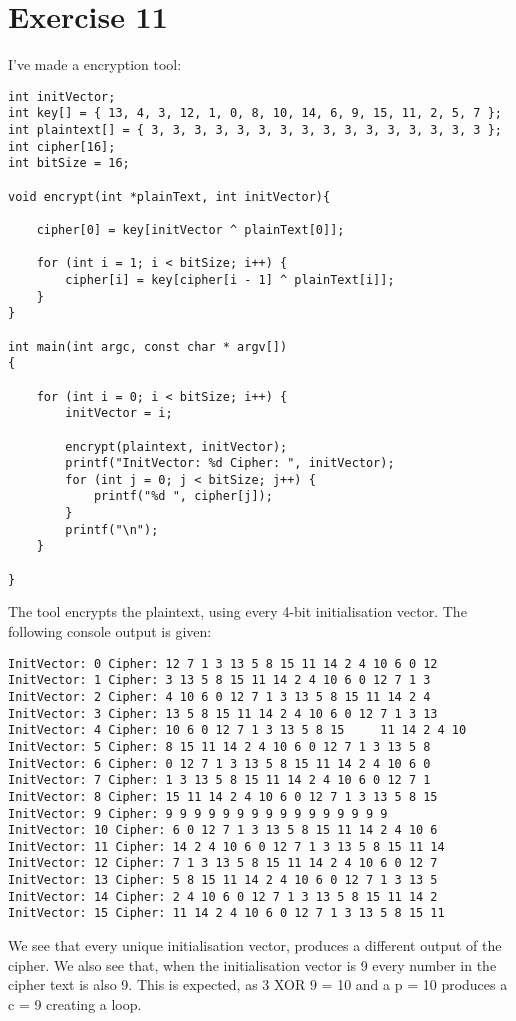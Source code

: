 \documentclass[a4paper,12pt]{article}
\begin{document}
\section*{Exercise 11}
I've made a encryption tool:
\begin{verbatim}
int initVector;
int key[] = { 13, 4, 3, 12, 1, 0, 8, 10, 14, 6, 9, 15, 11, 2, 5, 7 };
int plaintext[] = { 3, 3, 3, 3, 3, 3, 3, 3, 3, 3, 3, 3, 3, 3, 3, 3 };
int cipher[16];
int bitSize = 16;

void encrypt(int *plainText, int initVector){
    
    cipher[0] = key[initVector ^ plainText[0]];
    
    for (int i = 1; i < bitSize; i++) {
        cipher[i] = key[cipher[i - 1] ^ plainText[i]];
    }
}

int main(int argc, const char * argv[])
{   
   
    for (int i = 0; i < bitSize; i++) {
        initVector = i;
        
        encrypt(plaintext, initVector);
        printf("InitVector: %d Cipher: ", initVector);
        for (int j = 0; j < bitSize; j++) {
            printf("%d ", cipher[j]);
        }
        printf("\n");
    }
  
}
\end{verbatim}
\newpage
The tool encrypts the plaintext, using every 4-bit initialisation vector. The following console output is given:
\begin{verbatim}
InitVector: 0 Cipher: 12 7 1 3 13 5 8 15 11 14 2 4 10 6 0 12 
InitVector: 1 Cipher: 3 13 5 8 15 11 14 2 4 10 6 0 12 7 1 3 
InitVector: 2 Cipher: 4 10 6 0 12 7 1 3 13 5 8 15 11 14 2 4 
InitVector: 3 Cipher: 13 5 8 15 11 14 2 4 10 6 0 12 7 1 3 13 
InitVector: 4 Cipher: 10 6 0 12 7 1 3 13 5 8 15 	11 14 2 4 10 
InitVector: 5 Cipher: 8 15 11 14 2 4 10 6 0 12 7 1 3 13 5 8 
InitVector: 6 Cipher: 0 12 7 1 3 13 5 8 15 11 14 2 4 10 6 0 
InitVector: 7 Cipher: 1 3 13 5 8 15 11 14 2 4 10 6 0 12 7 1 
InitVector: 8 Cipher: 15 11 14 2 4 10 6 0 12 7 1 3 13 5 8 15 
InitVector: 9 Cipher: 9 9 9 9 9 9 9 9 9 9 9 9 9 9 9 9 
InitVector: 10 Cipher: 6 0 12 7 1 3 13 5 8 15 11 14 2 4 10 6 
InitVector: 11 Cipher: 14 2 4 10 6 0 12 7 1 3 13 5 8 15 11 14 
InitVector: 12 Cipher: 7 1 3 13 5 8 15 11 14 2 4 10 6 0 12 7 
InitVector: 13 Cipher: 5 8 15 11 14 2 4 10 6 0 12 7 1 3 13 5 
InitVector: 14 Cipher: 2 4 10 6 0 12 7 1 3 13 5 8 15 11 14 2 
InitVector: 15 Cipher: 11 14 2 4 10 6 0 12 7 1 3 13 5 8 15 11 
\end{verbatim}
We see that every unique initialisation vector, produces a different output of the cipher. We also see that, when the initialisation vector is 9 every number in the cipher text is also 9. This is expected, as 3 XOR 9 = 10 and a p = 10 produces a c = 9 creating a loop.
\end{document}
